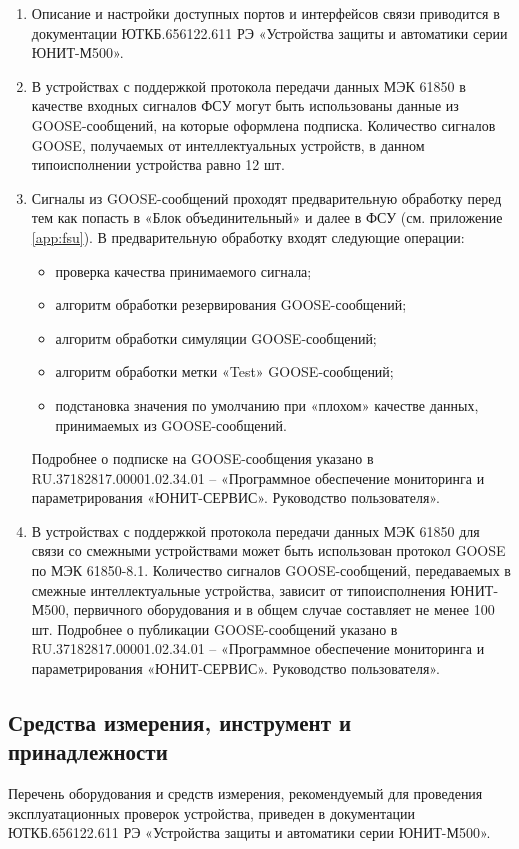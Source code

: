 \documentclass[a4paper, 12pt, table, hidelinks, DIV=calc]{extarticle}
\def\ManualUnitGeneral{ЮТКБ.656122.611 РЭ «Устройства защиты и автоматики серии ЮНИТ-М500»}
\begin{document}
\begin{enumerate}

\item
\sloppy Описание и настройки доступных портов и интерфейсов связи приводится в документации \ManualUnitGeneral.

\item
В устройствах с поддержкой протокола передачи данных МЭК 61850 в качестве входных сигналов ФСУ могут быть использованы данные из GOOSE-сообщений, на которые оформлена подписка.
Количество сигналов GOOSE, получаемых от интеллектуальных устройств, в данном типоисполнении устройства равно 12 шт.

\item
Сигналы из GOOSE-сообщений проходят предварительную обработку перед тем как попасть в «Блок объединительный» и далее в ФСУ (см. приложение \ref{app:fsu}).
В предварительную обработку входят следующие операции:
\begin{itemize}
\item проверка качества принимаемого сигнала;
\item алгоритм обработки резервирования GOOSE-сообщений;
\item алгоритм обработки симуляции GOOSE-сообщений;
\item алгоритм обработки метки «Test» GOOSE-сообщений;
\item подстановка значения по умолчанию при «плохом» качестве данных, принимаемых из GOOSE-сообщений.
\end{itemize}
Подробнее о подписке на GOOSE-сообщения указано в RU.37182817.00001.02.34.01 – «Программное обеспечение мониторинга и параметрирования «ЮНИТ-СЕРВИС». Руководство пользователя».

\item 
В устройствах с поддержкой протокола передачи данных МЭК 61850 для связи со смежными устройствами может быть использован протокол GOOSE по МЭК 61850-8.1.
Количество сигналов GOOSE-сообщений, передаваемых в смежные интеллектуальные устройства, зависит от типоисполнения ЮНИТ-М500, первичного оборудования и в общем случае составляет не менее 100 шт.
Подробнее о публикации GOOSE-сообщений указано в RU.37182817.00001.02.34.01 – «Программное обеспечение мониторинга и параметрирования «ЮНИТ-СЕРВИС». Руководство пользователя».

\end{enumerate}

\color{unidarkgreen}\subsection{Средства измерения, инструмент и принадлежности}\color{black}
Перечень оборудования и средств измерения, рекомендуемый для проведения эксплуатационных проверок устройства, приведен в документации \ManualUnitGeneral.
\end{document}
